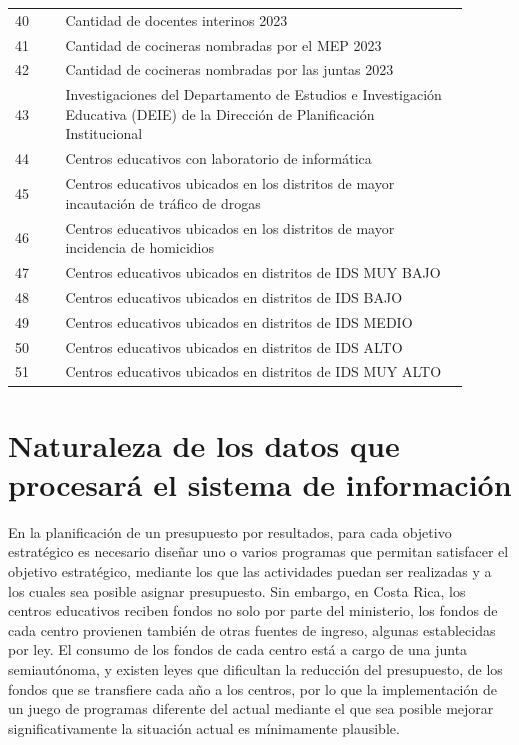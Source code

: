 \documentclass{article}
\begin{document}
\begin{multicols}{6}[]
\begin{center}
\begin{tabular}{p{0.1\linewidth}p{0.8\linewidth}}
		40 & Cantidad de docentes interinos 2023 \\
		41 & Cantidad de cocineras nombradas por el MEP 2023 \\
		42 & Cantidad de cocineras nombradas por las juntas 2023 \\
		43 & Investigaciones del Departamento de Estudios e Investigaci\'on Educativa (DEIE) de la Direcci\'on de Planificaci\'on Institucional \\
		44 & Centros educativos con laboratorio de inform\'atica \\
		45 & Centros educativos ubicados en los distritos de mayor incautaci\'on de tr\'afico de drogas \\
		46 & Centros educativos ubicados en los distritos de mayor incidencia de homicidios \\
		47 & Centros educativos ubicados en distritos de IDS MUY BAJO \\
		48 & Centros educativos ubicados en distritos de IDS BAJO \\
		49 & Centros educativos ubicados en distritos de IDS MEDIO \\
		50 & Centros educativos ubicados en distritos de IDS ALTO \\
		51 & Centros educativos ubicados en distritos de IDS MUY ALTO
	\end{tabular}
\end{center}

\section{Naturaleza de los datos que procesar\'a el sistema de informaci\'on} \label{sec:data}


En la planificaci\'on de un presupuesto por resultados, para cada objetivo estrat\'egico es necesario dise\~nar uno o varios programas que permitan satisfacer el objetivo estrat\'egico, mediante los que las actividades puedan ser realizadas y a los cuales sea posible asignar presupuesto. Sin embargo, en Costa Rica, los centros educativos reciben fondos no solo por parte del ministerio, los fondos de cada centro provienen tambi\'en de otras fuentes de ingreso, algunas establecidas por ley. El consumo de los fondos de cada centro est\'a a cargo de una junta semiaut\'onoma, y existen leyes que dificultan la reducci\'on del presupuesto, de los fondos que se transfiere cada a\~no a los centros, por lo que la implementaci\'on de un juego de programas diferente del actual mediante el que sea posible mejorar significativamente la situaci\'on actual es m\'inimamente plausible.


\end{multicols}
\end{document}
